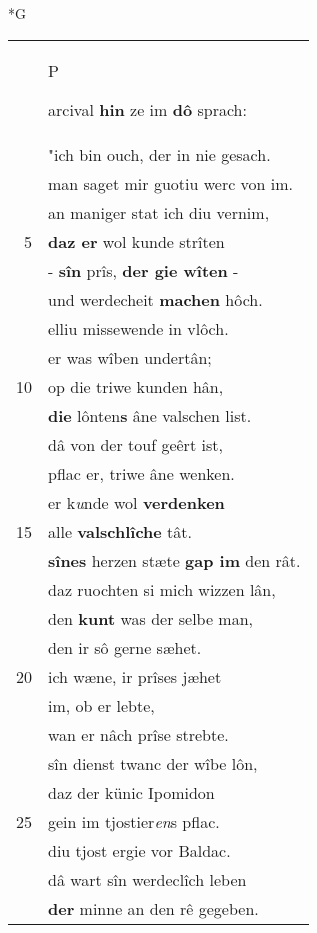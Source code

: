 \documentclass[8pt,a4paper,notitlepage]{article}
\begin{document}
\newpage
\begin{table}[ht]
\begin{minipage}[t]{0.5\linewidth}
\small
\begin{center}*G
\end{center}
\begin{tabular}{rl}
 & \begin{large}P\end{large}arcival \textbf{hin} ze im \textbf{dô} sprach:\\ 
 & "ich bin ouch, der in nie gesach.\\ 
 & man saget mir guotiu werc von im.\\ 
 & an maniger stat ich diu vernim,\\ 
5 & \textbf{daz er} wol kunde strîten\\ 
 & - \textbf{sîn} prîs, \textbf{der gie wîten} -\\ 
 & und werdecheit \textbf{machen} hôch.\\ 
 & elliu missewende in vlôch.\\ 
 & er was wîben undertân;\\ 
10 & op die triwe kunden hân,\\ 
 & \textbf{die} lônten\textbf{s} âne valschen list.\\ 
 & dâ von der touf geêrt ist,\\ 
 & pflac er, triwe âne wenken.\\ 
 & er k\textit{u}nde wol \textbf{verdenken}\\ 
15 & alle \textbf{valschlîche} tât.\\ 
 & \textbf{sînes} herzen stæte \textbf{gap im} den rât.\\ 
 & daz ruochten si mich wizzen lân,\\ 
 & den \textbf{kunt} was der selbe man,\\ 
 & den ir sô gerne sæhet.\\ 
20 & ich wæne, ir prîses jæhet\\ 
 & im, ob er lebte,\\ 
 & wan er nâch prîse strebte.\\ 
 & sîn dienst twanc der wîbe lôn,\\ 
 & daz der künic Ipomidon\\ 
25 & gein im tjostier\textit{en}s pflac.\\ 
 & diu tjost ergie vor Baldac.\\ 
 & dâ wart sîn werdeclîch leben\\ 
 & \textbf{der} minne an den rê gegeben.\\ 

\end{tabular}
\end{minipage}
\end{table}
\end{document}
